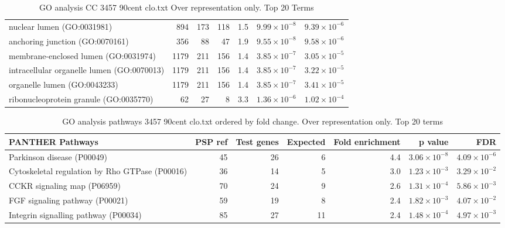 \begin{table}[ht]
\begin{adjustbox}{width=\textwidth}
\begin{tabular}{lrrrrrr}
  nuclear lumen (GO:0031981) & 894 & 173 & 118 & 1.5 & $9.99 \times 10^{-8}$ & $9.39 \times 10^{-6}$ \\ 
  anchoring junction (GO:0070161) & 356 & 88 & 47 & 1.9 & $9.55 \times 10^{-8}$ & $9.58 \times 10^{-6}$ \\ 
  membrane-enclosed lumen (GO:0031974) & 1179 & 211 & 156 & 1.4 & $3.85 \times 10^{-7}$ & $3.05 \times 10^{-5}$ \\ 
  intracellular organelle lumen (GO:0070013) & 1179 & 211 & 156 & 1.4 & $3.85 \times 10^{-7}$ & $3.22 \times 10^{-5}$ \\ 
  organelle lumen (GO:0043233) & 1179 & 211 & 156 & 1.4 & $3.85 \times 10^{-7}$ & $3.41 \times 10^{-5}$ \\ 
  ribonucleoprotein granule (GO:0035770) & 62 & 27 & 8 & 3.3 & $1.36 \times 10^{-6}$ & $1.02 \times 10^{-4}$ \\ 
   \hline
\end{tabular}
\end{adjustbox}
\caption{GO analysis CC 3457 90cent clo.txt Over representation only. Top 20 Terms} 
\label{tab:GO analysis CC 3457 90cent clo.txt Over representation only. Top 20 Terms}
\end{table}

\begin{table}[ht]
\centering
\begin{adjustbox}{width=\textwidth}
\begin{tabular}{lrrrrrr}
  \hline
PANTHER Pathways & PSP ref & Test genes & Expected & Fold enrichment & p value & FDR \\ 
  \hline
Parkinson disease (P00049) & 45 & 26 & 6 & 4.4 & $3.06 \times 10^{-8}$ & $4.09 \times 10^{-6}$ \\ 
  Cytoskeletal regulation by Rho GTPase (P00016) & 36 & 14 & 5 & 3.0 & $1.23 \times 10^{-3}$ & $3.29 \times 10^{-2}$ \\ 
  CCKR signaling map (P06959) & 70 & 24 & 9 & 2.6 & $1.31 \times 10^{-4}$ & $5.86 \times 10^{-3}$ \\ 
  FGF signaling pathway (P00021) & 59 & 19 & 8 & 2.4 & $1.82 \times 10^{-3}$ & $4.07 \times 10^{-2}$ \\ 
  Integrin signalling pathway (P00034) & 85 & 27 & 11 & 2.4 & $1.48 \times 10^{-4}$ & $4.97 \times 10^{-3}$ \\ 
   \hline
\end{tabular}
\end{adjustbox}
\caption{GO analysis pathways 3457 90cent clo.txt ordered by fold change. Over representation only. Top 20 terms} 
\label{tab:GO analysis pathways 3457 90cent clo.txt ordered by fold change. Over representation only. Top 20 terms}
\end{table}


